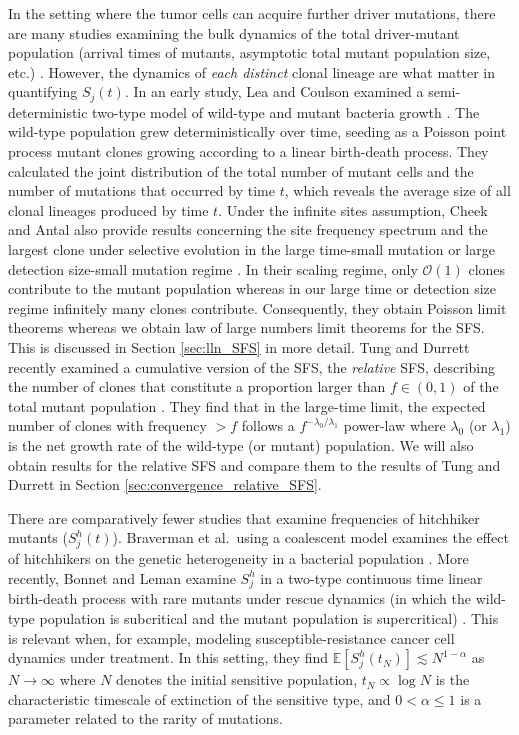 \documentclass{article}
\numberwithin{equation}{section}
\begin{document}
In the setting where the tumor cells can acquire further driver mutations, there are many studies examining the bulk dynamics of the total driver-mutant population (arrival times of mutants, asymptotic total mutant population size, etc.) \cite{iwasa2006,durrett2010,nicholson2023}. However, the dynamics of \textit{each distinct} clonal lineage are what matter in  quantifying $S_j(t)$. In an early study, Lea and Coulson examined a semi-deterministic two-type model of wild-type and mutant bacteria growth \cite{lea1949,zheng1999}. The wild-type population grew deterministically over time, seeding as a Poisson point process mutant clones growing according to a linear birth-death process. They calculated the joint distribution of the total number of mutant cells and the number of mutations that occurred by time $t$, which reveals the average size of all clonal lineages produced by time $t$. Under the infinite sites assumption, Cheek and Antal also provide results concerning the site frequency spectrum and the largest clone under selective evolution in the large time-small mutation or large detection size-small mutation regime \cite{cheek2018}. In their scaling regime, only $\mathcal{O}(1)$ clones contribute to the mutant population whereas in our large time or detection size regime infinitely many clones contribute. Consequently, they obtain Poisson limit theorems whereas we obtain law of large numbers limit theorems for the SFS. This is discussed in Section \ref{sec:lln_SFS} in more detail. Tung and Durrett recently examined a cumulative version of the SFS, the \textit{relative} SFS, describing the number of clones that constitute a proportion larger than $f\in (0,1)$ of the total mutant population \cite{tung}. They find that in the large-time limit, the expected number of clones with frequency $>f$ follows a $f^{-\lambda_0/\lambda_1}$ power-law where $\lambda_0$ (or $\lambda_1$) is the net growth rate of the wild-type (or mutant) population. We will also obtain results for the relative SFS and compare them to the results of Tung and Durrett in Section \ref{sec:convergence_relative_SFS}.

There are comparatively fewer studies that examine frequencies of hitchhiker mutants ($S_j^h(t)$). Braverman et al.~using a coalescent model examines the effect of hitchhikers on the genetic heterogeneity in a bacterial population \cite{braverman1995}. More recently, Bonnet and Leman examine $S_j^h$ in a two-type continuous time linear birth-death process with rare mutants under rescue dynamics (in which the wild-type population is subcritical and the mutant population is supercritical) \cite{bonnet2024}. This is relevant when, for example, modeling susceptible-resistance cancer cell dynamics under treatment. In this setting, they find $\mathbb{E}[S_j^h(t_N)]\lesssim N^{1-\alpha}$ as $N\to\infty$ where $N$ denotes the initial sensitive population, $t_N\propto \log N$ is the characteristic timescale of extinction of the sensitive type, and $0<\alpha\leq 1$ is a parameter related to the rarity of mutations.
\end{document}

